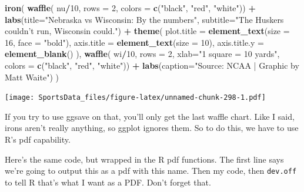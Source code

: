 \documentclass[
]{book}
\newenvironment{Shaded}{\begin{snugshade}}{\end{snugshade}}
\newcommand{\DataTypeTok}[1]{\textcolor[rgb]{0.13,0.29,0.53}{#1}}
\newcommand{\DecValTok}[1]{\textcolor[rgb]{0.00,0.00,0.81}{#1}}
\newcommand{\KeywordTok}[1]{\textcolor[rgb]{0.13,0.29,0.53}{\textbf{#1}}}
\newcommand{\NormalTok}[1]{#1}
\newcommand{\OperatorTok}[1]{\textcolor[rgb]{0.81,0.36,0.00}{\textbf{#1}}}
\newcommand{\StringTok}[1]{\textcolor[rgb]{0.31,0.60,0.02}{#1}}
\begin{document}
\begin{Shaded}
\begin{Highlighting}[]
\KeywordTok{iron}\NormalTok{(}
 \KeywordTok{waffle}\NormalTok{(}
\NormalTok{   nu}\OperatorTok{/}\DecValTok{10}\NormalTok{, }
   \DataTypeTok{rows =} \DecValTok{2}\NormalTok{, }
   \DataTypeTok{colors =} \KeywordTok{c}\NormalTok{(}\StringTok{"black"}\NormalTok{, }\StringTok{"red"}\NormalTok{, }\StringTok{"white"}\NormalTok{)) }\OperatorTok{+}\StringTok{ }
\StringTok{   }\KeywordTok{labs}\NormalTok{(}\DataTypeTok{title=}\StringTok{"Nebraska vs Wisconsin: By the numbers"}\NormalTok{, }\DataTypeTok{subtitle=}\StringTok{"The Huskers couldn't run, Wisconsin could."}\NormalTok{) }\OperatorTok{+}\StringTok{ }
\StringTok{   }\KeywordTok{theme}\NormalTok{(}
    \DataTypeTok{plot.title =} \KeywordTok{element_text}\NormalTok{(}\DataTypeTok{size =} \DecValTok{16}\NormalTok{, }\DataTypeTok{face =} \StringTok{"bold"}\NormalTok{),}
    \DataTypeTok{axis.title =} \KeywordTok{element_text}\NormalTok{(}\DataTypeTok{size =} \DecValTok{10}\NormalTok{),}
    \DataTypeTok{axis.title.y =} \KeywordTok{element_blank}\NormalTok{()}
\NormalTok{  ),}
 \KeywordTok{waffle}\NormalTok{(}
\NormalTok{   wi}\OperatorTok{/}\DecValTok{10}\NormalTok{, }
   \DataTypeTok{rows =} \DecValTok{2}\NormalTok{, }
   \DataTypeTok{xlab=}\StringTok{"1 square = 10 yards"}\NormalTok{, }
   \DataTypeTok{colors =} \KeywordTok{c}\NormalTok{(}\StringTok{"black"}\NormalTok{, }\StringTok{"red"}\NormalTok{, }\StringTok{"white"}\NormalTok{)) }\OperatorTok{+}\StringTok{ }\KeywordTok{labs}\NormalTok{(}\DataTypeTok{caption=}\StringTok{"Source: NCAA | Graphic by Matt Waite"}\NormalTok{)}
\NormalTok{) }
\end{Highlighting}
\end{Shaded}

\texttt{[image: SportsData\_files/figure-latex/unnamed-chunk-298-1.pdf]}

If you try to use ggsave on that, you'll only get the last waffle chart. Like I said, irons aren't really anything, so ggplot ignores them. So to do this, we have to use R's pdf capability.

Here's the same code, but wrapped in the R pdf functions. The first line says we're going to output this as a pdf with this name. Then my code, then \texttt{dev.off} to tell R that's what I want as a PDF. Don't forget that.
\end{document}
